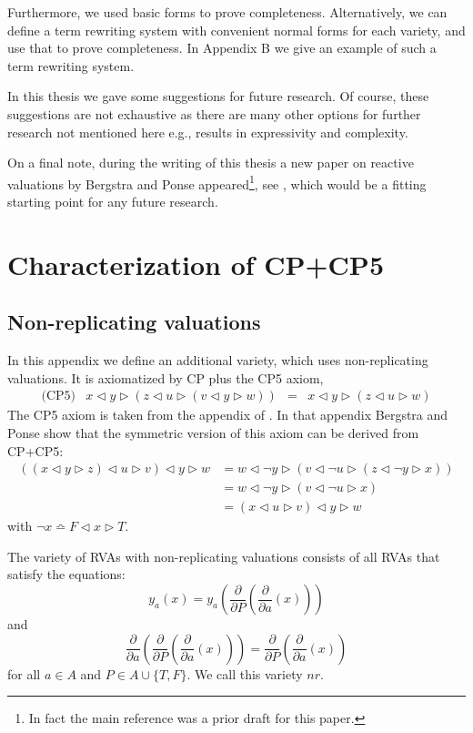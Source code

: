 \documentclass[a4paper,twoside,openright]{report}
\newcommand{\dd}[1]{\frac{\partial}{\partial #1}}
\newcommand{\syn}{\bumpeq}
\newcommand{\lef}{\ensuremath{\triangleleft}}
\newcommand{\rig}{\ensuremath{\triangleright}}
\begin{document}
Furthermore, we used basic forms to prove completeness. Alternatively, we can define a term rewriting system with convenient normal forms for each variety, and use that to prove completeness. In Appendix B we give an example of such a term rewriting system. 

In this thesis we gave some suggestions for future research. Of course, these suggestions are not exhaustive as there are many other options for further research not mentioned here e.g., results in expressivity and complexity.

On a final note, during the writing of this thesis a new paper on reactive valuations by Bergstra and Ponse appeared\footnote{In fact the main reference \cite{main} was a prior draft for this paper.}, see \cite{future}, which would be a fitting starting point for any future research.

\appendix

\chapter{Characterization of CP+CP5}

\section{Non-replicating valuations}
In this appendix we define an additional variety, which uses non-replicating valuations. It is axiomatized by CP plus the CP5 axiom,
\[
\begin{array}{lrcl}
\text{(CP5)} & x\lef y\rig (z\lef u \rig(v\lef y\rig w)) & = & x\lef y\rig (z\lef u\rig w)
\end{array}
\]
The CP5 axiom is taken from the appendix of \cite{main}. In that appendix Bergstra and Ponse show that the symmetric version of this axiom can be derived from CP+CP5:
\begin{align*}
((x\lef y\rig z)\lef u\rig v)\lef y\rig w
&= w\lef\neg y\rig (v\lef \neg u\rig(z\lef\neg y\rig x))\\
&= w\lef\neg y\rig(v\lef \neg u\rig x)\\
&=(x\lef u\rig v)\lef y\rig w
\end{align*}
with $\neg x\syn F\lef x\rig T$.

The variety of RVAs with non-replicating valuations consists of all RVAs that satisfy the
equations:
\[
y_a(x) = y_a(\dd P(\dd a(x)))
\]
and
\[
\dd a(\dd P(\dd a(x))) = \dd P(\dd a(x))
\]
for all $a\in A$ and $P\in A\cup\{T,F\}$. We call this variety $nr$.
\end{document}
